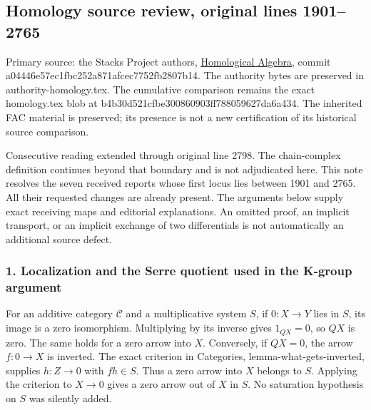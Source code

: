 \documentclass[11pt]{article}
\begin{document}
\subsection{Homology source review, original lines 1901--2765}\label{homology-source-review-original-lines-19012765}

Primary source: the Stacks Project authors, \href{https://github.com/stacks/stacks-project/blob/a04446e57ec1fbc252a871afcec7752fb2807b14/homology.tex}{Homological Algebra}, commit a04446e57ec1fbc252a871afcec7752fb2807b14. The authority bytes are preserved in authority-homology.tex. The cumulative comparison remains the exact homology.tex blob at b4b30d521cfbe300860903ff788059627da6a434. The inherited FAC material is preserved; its presence is not a new certification of its historical source comparison.

Consecutive reading extended through original line 2798. The chain-complex definition continues beyond that boundary and is not adjudicated here. This note resolves the seven received reports whose first locus lies between 1901 and 2765. All their requested changes are already present. The arguments below supply exact receiving maps and editorial explanations. An omitted proof, an implicit transport, or an implicit exchange of two differentials is not automatically an additional source defect.

\subsubsection{1. Localization and the Serre quotient used in the K-group argument}\label{localization-and-the-serre-quotient-used-in-the-k-group-argument}

For an additive category \(\mathcal C\) and a multiplicative system \(S\), if \(0:X\to Y\) lies in \(S\), its image is a zero isomorphism. Multiplying by its inverse gives \(1_{QX}=0\), so \(QX\) is zero. The same holds for a zero arrow into \(X\). Conversely, if \(QX=0\), the arrow \(f:0\to X\) is inverted. The exact criterion in Categories, lemma-what-gets-inverted, supplies \(h:Z\to0\) with \(fh\in S\). Thus a zero arrow into \(X\) belongs to \(S\). Applying the criterion to \(X\to0\) gives a zero arrow out of \(X\) in \(S\). No saturation hypothesis on \(S\) was silently added.
\end{document}
